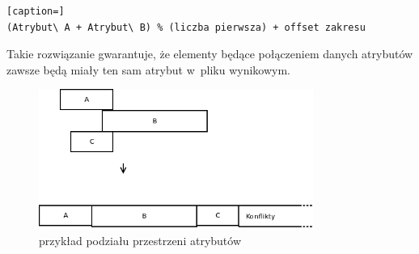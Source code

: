 \documentclass[a4paper]{article}
\begin{document}
\begin{lstlisting}[caption=]
(Atrybut\ A + Atrybut\ B) % (liczba pierwsza) + offset zakresu
\end{lstlisting}

Takie rozwiązanie gwarantuje, że elementy będące połączeniem danych atrybutów zawsze będą miały ten sam atrybut w~pliku wynikowym.

\begin{figure}[h]
  \centering
  \includegraphics[width=0.8\textwidth]{konflikty.png}
  \caption{przykład podziału przestrzeni atrybutów}
\end{figure}
\end{document}
